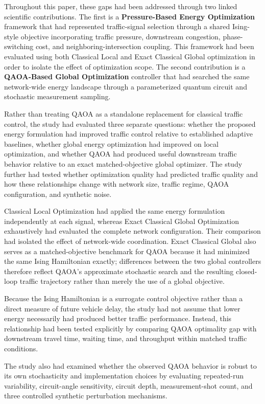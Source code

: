 Throughout this paper, these gaps had been addressed through two linked scientific
contributions. The first is a \textbf{Pressure-Based Energy Optimization}
framework that had represented traffic-signal selection through a shared Ising-style
objective incorporating traffic pressure, downstream congestion, phase-switching
cost, and neighboring-intersection coupling. This framework had been evaluated using
both Classical Local and Exact Classical Global optimization in order to isolate
the effect of optimization scope. The second contribution is a
\textbf{QAOA-Based Global Optimization} controller that had searched the same
network-wide energy landscape through a parameterized quantum circuit and
stochastic measurement sampling.

Rather than treating QAOA as a standalone replacement for classical traffic
control, the study had evaluated three separate questions: whether the proposed
energy formulation had improved traffic control relative to established adaptive
baselines, whether global energy optimization had improved on local optimization,
and whether QAOA had produced useful downstream traffic behavior relative to an
exact matched-objective global optimizer. The study further had tested whether
optimization quality had predicted traffic quality and how these relationships change
with network size, traffic regime, QAOA configuration, and synthetic noise.

Classical Local Optimization had applied the same energy formulation independently
at each signal, whereas Exact Classical Global Optimization exhaustively
had evaluated the complete network configuration. Their comparison had isolated the
effect of network-wide coordination. Exact Classical Global also serves as a
matched-objective benchmark for QAOA because it had minimized the same Ising
Hamiltonian exactly; differences between the two global controllers therefore
reflect QAOA's approximate stochastic search and the resulting closed-loop
traffic trajectory rather than merely the use of a global objective.

Because the Ising Hamiltonian is a surrogate control objective rather than a
direct measure of future vehicle delay, the study had not assume that lower
energy necessarily had produced better traffic performance. Instead, this
relationship had been tested explicitly by comparing QAOA optimality gap with
downstream travel time, waiting time, and throughput within matched traffic
conditions.

The study also had examined whether the observed QAOA behavior is robust to its
own stochasticity and implementation choices by evaluating repeated-run
variability, circuit-angle sensitivity, circuit depth, measurement-shot count,
and three controlled synthetic perturbation mechanisms.

